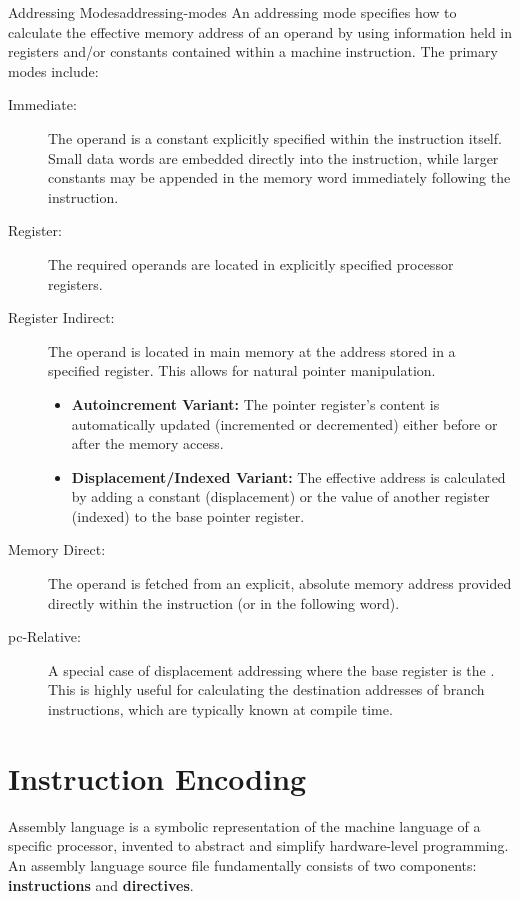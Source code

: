 \begin{definition}{Addressing Modes}{addressing-modes}
    An addressing mode specifies how to calculate the effective memory address of an operand by using information held in registers and/or constants contained within a machine instruction. The primary modes include:
    \begin{description}
        \item[Immediate:] The operand is a constant explicitly specified within the instruction itself. Small data words are embedded directly into the instruction, while larger constants may be appended in the memory word immediately following the instruction.
        \item[Register:] The required operands are located in explicitly specified processor registers.
        \item[Register Indirect:] The operand is located in main memory at the address stored in a specified register. This allows for natural pointer manipulation.
        \begin{itemize}
            \item \textbf{Autoincrement Variant:} The pointer register's content is automatically updated (incremented or decremented) either before or after the memory access.
            \item \textbf{Displacement/Indexed Variant:} The effective address is calculated by adding a constant (displacement) or the value of another register (indexed) to the base pointer register.
        \end{itemize}
        \item[Memory Direct:] The operand is fetched from an explicit, absolute memory address provided directly within the instruction (or in the following word).
        \item[\gls{pc}-Relative:] A special case of displacement addressing where the base register is the . This is highly useful for calculating the destination addresses of branch instructions, which are typically known at compile time.
    \end{description}
\end{definition}

\section{Instruction Encoding}
Assembly language is a symbolic representation of the machine language of a specific processor, invented to abstract and simplify hardware-level programming. An assembly language source file fundamentally consists of two components: \textbf{instructions} and \textbf{directives}. 

